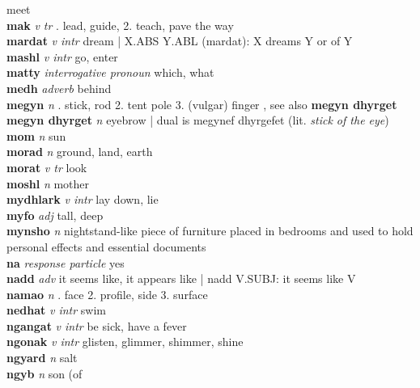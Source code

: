 \textperiodcentered meet\\\textbf{mak}   \emph{v tr} . lead, guide, 2. teach, pave the way \\\textbf{mardat}   \emph{v intr} \textperiodcentered dream | X.ABS Y.ABL (mardat): X dreams Y or of Y\\\textbf{mashl}   \emph{v intr} \textperiodcentered go, enter\\\textbf{matty}   \emph{interrogative pronoun} \textperiodcentered which, what\\\textbf{medh}   \emph{adverb} \textperiodcentered behind\\\textbf{megyn}   \emph{n} . stick, rod 2. tent pole 3. (vulgar) finger , see also \textbf{megyn dhyrget}\\\textbf{megyn dhyrget}   \emph{n} \textperiodcentered eyebrow | dual is megynef dhyrgefet (lit. \emph{stick of the eye})\\\textbf{mom}   \emph{n} \textperiodcentered sun\\\textbf{morad}   \emph{n} \textperiodcentered ground, land, earth\\\textbf{morat}   \emph{v tr} \textperiodcentered look\\\textbf{moshl}   \emph{n} \textperiodcentered mother\\\textbf{mydhlark}   \emph{v intr} \textperiodcentered lay down, lie\\\textbf{myfo}   \emph{adj} \textperiodcentered tall, deep\\\textbf{mynsho}   \emph{n} \textperiodcentered nightstand-like piece of furniture placed in bedrooms and used to hold personal effects and essential documents\\\textbf{na}   \emph{response particle} \textperiodcentered yes\\\textbf{nadd}   \emph{adv} \textperiodcentered it seems like, it appears like | nadd V.SUBJ: it seems like V\\\textbf{namao}   \emph{n} . face 2. profile, side 3. surface \\\textbf{nedhat}   \emph{v intr} \textperiodcentered swim\\\textbf{ngangat}   \emph{v intr} \textperiodcentered be sick, have a fever\\\textbf{ngonak}   \emph{v intr} \textperiodcentered glisten, glimmer, shimmer, shine\\\textbf{ngyard}   \emph{n} \textperiodcentered salt\\\textbf{ngyb}   \emph{n} \textperiodcentered son (of 